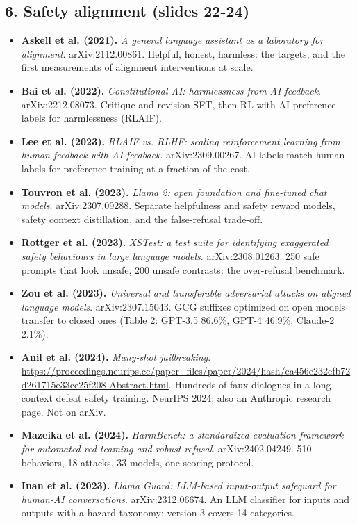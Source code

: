 \documentclass[11pt,letterpaper]{article}
\begin{document}
\subsection*{6. Safety alignment (slides 22-24)}
\begin{itemize}[leftmargin=1.2em,itemsep=3pt]\sloppy
\item \textbf{Askell et al. (2021).} \textit{A general language assistant as a laboratory for alignment}. arXiv:2112.00861. Helpful, honest, harmless: the targets, and the first measurements of alignment interventions at scale.
\item \textbf{Bai et al. (2022).} \textit{Constitutional AI: harmlessness from AI feedback}. arXiv:2212.08073. Critique-and-revision SFT, then RL with AI preference labels for harmlessness (RLAIF).
\item \textbf{Lee et al. (2023).} \textit{RLAIF vs. RLHF: scaling reinforcement learning from human feedback with AI feedback}. arXiv:2309.00267. AI labels match human labels for preference training at a fraction of the cost.
\item \textbf{Touvron et al. (2023).} \textit{Llama 2: open foundation and fine-tuned chat models}. arXiv:2307.09288. Separate helpfulness and safety reward models, safety context distillation, and the false-refusal trade-off.
\item \textbf{Rottger et al. (2023).} \textit{XSTest: a test suite for identifying exaggerated safety behaviours in large language models}. arXiv:2308.01263. 250 safe prompts that look unsafe, 200 unsafe contrasts: the over-refusal benchmark.
\item \textbf{Zou et al. (2023).} \textit{Universal and transferable adversarial attacks on aligned language models}. arXiv:2307.15043. GCG suffixes optimized on open models transfer to closed ones (Table 2: GPT-3.5 86.6\%, GPT-4 46.9\%, Claude-2 2.1\%).
\item \textbf{Anil et al. (2024).} \textit{Many-shot jailbreaking}. \url{https://proceedings.neurips.cc/paper_files/paper/2024/hash/ea456e232efb72d261715e33ce25f208-Abstract.html}. Hundreds of faux dialogues in a long context defeat safety training. NeurIPS 2024; also an Anthropic research page. Not on arXiv.
\item \textbf{Mazeika et al. (2024).} \textit{HarmBench: a standardized evaluation framework for automated red teaming and robust refusal}. arXiv:2402.04249. 510 behaviors, 18 attacks, 33 models, one scoring protocol.
\item \textbf{Inan et al. (2023).} \textit{Llama Guard: LLM-based input-output safeguard for human-AI conversations}. arXiv:2312.06674. An LLM classifier for inputs and outputs with a hazard taxonomy; version 3 covers 14 categories.

\end{itemize}
\end{document}
